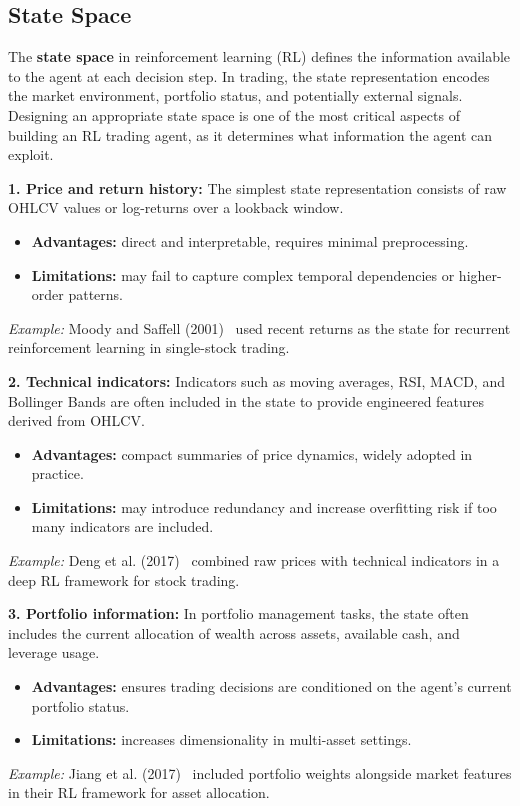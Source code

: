 \documentclass[12pt,a4paper]{report}
\begin{document}
\subsection{State Space}

The \textbf{state space} in reinforcement learning (RL) defines the information available to the agent at each decision step. In trading, the state representation encodes the market environment, portfolio status, and potentially external signals. Designing an appropriate state space is one of the most critical aspects of building an RL trading agent, as it determines what information the agent can exploit.

\bigskip
\textbf{1. Price and return history:}  
The simplest state representation consists of raw OHLCV values or log-returns over a lookback window.  
\begin{itemize}
    \item \textbf{Advantages:} direct and interpretable, requires minimal preprocessing.
    \item \textbf{Limitations:} may fail to capture complex temporal dependencies or higher-order patterns.
\end{itemize}
\textit{Example:} Moody and Saffell (2001)~\cite{moody2001learning} used recent returns as the state for recurrent reinforcement learning in single-stock trading.

\bigskip
\textbf{2. Technical indicators:}  
Indicators such as moving averages, RSI, MACD, and Bollinger Bands are often included in the state to provide engineered features derived from OHLCV.  
\begin{itemize}
    \item \textbf{Advantages:} compact summaries of price dynamics, widely adopted in practice.
    \item \textbf{Limitations:} may introduce redundancy and increase overfitting risk if too many indicators are included.
\end{itemize}
\textit{Example:} Deng et al. (2017)~\cite{deng2017deep} combined raw prices with technical indicators in a deep RL framework for stock trading.

\bigskip
\textbf{3. Portfolio information:}  
In portfolio management tasks, the state often includes the current allocation of wealth across assets, available cash, and leverage usage.  
\begin{itemize}
    \item \textbf{Advantages:} ensures trading decisions are conditioned on the agent’s current portfolio status.
    \item \textbf{Limitations:} increases dimensionality in multi-asset settings.
\end{itemize}
\textit{Example:} Jiang et al. (2017)~\cite{jiang2017deeprl} included portfolio weights alongside market features in their RL framework for asset allocation.
\end{document}

